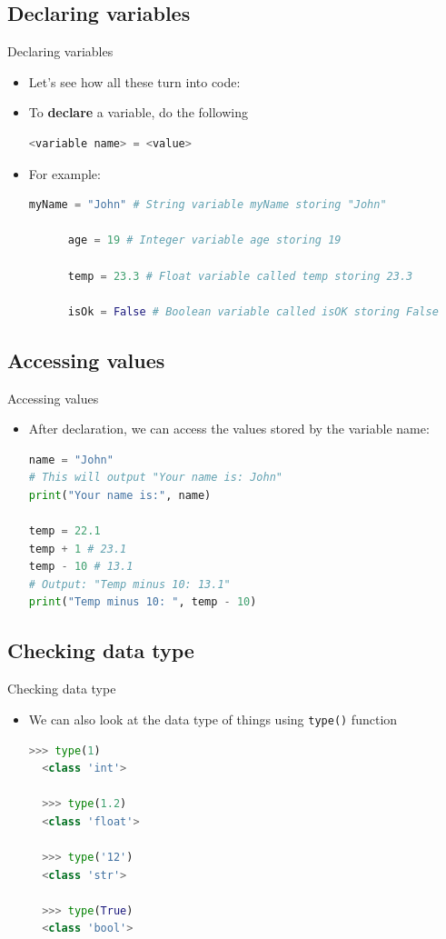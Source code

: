 \documentclass[10pt,xcolor={table,dvipsnames},t]{beamer}
\begin{document}
\subsection{Declaring variables}
\begin{frame}[fragile]{Declaring variables}
  \begin{itemize}
    \item Let's see how all these turn into code:
    \item To \textbf{declare} a variable, do the following
  \begin{lstlisting}[language=python]
    <variable name> = <value>
\end{lstlisting}
    \item For example:
    \begin{lstlisting}[language=python]
      myName = "John" # String variable myName storing "John"

      age = 19 # Integer variable age storing 19
      
      temp = 23.3 # Float variable called temp storing 23.3

      isOk = False # Boolean variable called isOK storing False 
\end{lstlisting}
  \end{itemize}
\end{frame}

\subsection{Accessing values}
\begin{frame}[fragile]{Accessing values}
  \begin{itemize}
    \item After declaration, we can access the values stored by the variable name:
\begin{lstlisting}[language=python]
name = "John"
# This will output "Your name is: John"
print("Your name is:", name) 

temp = 22.1
temp + 1 # 23.1 
temp - 10 # 13.1
# Output: "Temp minus 10: 13.1"
print("Temp minus 10: ", temp - 10) 
\end{lstlisting}
  \end{itemize}
\end{frame}

\subsection{Checking data type}
\begin{frame}[fragile]{Checking data type}
  \begin{itemize}
    \item We can also look at the data type of things using \texttt{type()} function
\begin{lstlisting}[language=python]
  >>> type(1)
  <class 'int'>

  >>> type(1.2)
  <class 'float'>

  >>> type('12')
  <class 'str'>
  
  >>> type(True)
  <class 'bool'>
\end{lstlisting}
  \end{itemize}
\end{frame}
\end{document}
